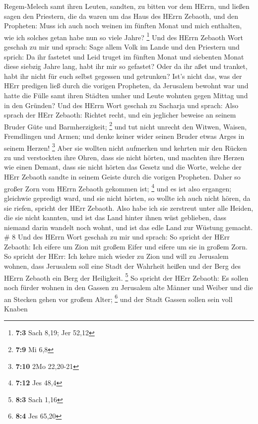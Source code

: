 Regem-Melech samt ihren Leuten, sandten, zu bitten vor dem HErrn,
 und ließen sagen den Priestern, die da waren um das Haus
des HErrn Zebaoth, und den Propheten: Muss ich auch noch weinen im
fünften Monat und mich enthalten, wie ich solches getan habe nun so
viele Jahre? \footnote{\textbf{7:3} Sach 8,19; Jer 52,12} 
Und des HErrn Zebaoth Wort geschah zu mir und sprach:  Sage
allem Volk im Lande und den Priestern und sprich: Da ihr fastetet und
Leid truget im fünften Monat und siebenten Monat diese siebzig Jahre
lang, habt ihr mir so gefastet?  Oder da ihr aßet und
tranket, habt ihr nicht für euch selbst gegessen und getrunken?
 Ist's nicht das, was der HErr predigen ließ durch die
vorigen Propheten, da Jerusalem bewohnt war und hatte die Fülle samt
ihren Städten umher und Leute wohnten gegen Mittag und in den Gründen?
 Und des HErrn Wort geschah zu Sacharja und sprach:
 Also sprach der HErr Zebaoth: Richtet recht, und ein
jeglicher beweise an seinem Bruder Güte und Barmherzigkeit; \footnote{\textbf{7:9}
  Mi 6,8}  und tut nicht unrecht den Witwen, Waisen,
Fremdlingen und Armen; und denke keiner wider seinen Bruder etwas Arges
in seinem Herzen! \footnote{\textbf{7:10} 2Mo 22,20-21} 
Aber sie wollten nicht aufmerken und kehrten mir den Rücken zu und
verstockten ihre Ohren, dass sie nicht hörten,  und machten
ihre Herzen wie einen Demant, dass sie nicht hörten das Gesetz und die
Worte, welche der HErr Zebaoth sandte in seinem Geiste durch die vorigen
Propheten. Daher so großer Zorn vom HErrn Zebaoth gekommen ist;
\footnote{\textbf{7:12} Jes 48,4}  und es ist also
ergangen; gleichwie gepredigt ward, und sie nicht hörten, so wollte ich
auch nicht hören, da sie riefen, spricht der HErr Zebaoth. 
Also habe ich sie zerstreut unter alle Heiden, die sie nicht kannten,
und ist das Land hinter ihnen wüst geblieben, dass niemand darin wandelt
noch wohnt, und ist das edle Land zur Wüstung gemacht. \# 8 
Und des HErrn Wort geschah zu mir und sprach:  So spricht
der HErr Zebaoth: Ich eifere um Zion mit großem Eifer und eifere um sie
in großem Zorn.  So spricht der HErr: Ich kehre mich wieder
zu Zion und will zu Jerusalem wohnen, dass Jerusalem soll eine Stadt der
Wahrheit heißen und der Berg des HErrn Zebaoth ein Berg der Heiligkeit.
\footnote{\textbf{8:3} Sach 1,16}  So spricht der HErr
Zebaoth: Es sollen noch fürder wohnen in den Gassen zu Jerusalem alte
Männer und Weiber und die an Stecken gehen vor großem Alter; \footnote{\textbf{8:4}
  Jes 65,20}  und der Stadt Gassen sollen sein voll Knaben
